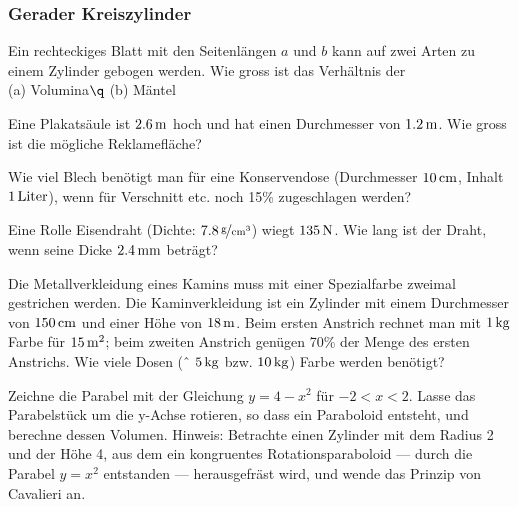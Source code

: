 \documentclass[%
11pt,%
twoside,%
titlepage,%
a4page,%
german,%
headsepline%
]{scrartcl}
\begin{document}
\subsubsection{Gerader Kreiszylinder}
\begin{ueb}
Ein rechteckiges Blatt mit den Seitenl\"angen $a$ und $b$ kann auf zwei Arten zu einem Zylinder gebogen werden. Wie gross ist das Verh\"altnis der \\[1ex]
\hspace*{2.7ex}(a) Volumina$\q$ (b) M\"antel
\end{ueb}

\begin{ueb}
Eine Plakats\"aule ist $\unit[2.6]{m}$ hoch und hat einen Durchmesser von $\unit[1.2]{m}$. Wie gross ist die m\"ogliche Reklamefl\"ache?
\end{ueb}

\begin{ueb}
Wie viel Blech ben\"otigt man f\"ur eine Konservendose (Durchmesser $\unit[10]{cm}$, Inhalt $\unit[1]{Liter}$), wenn f\"ur Verschnitt etc. noch 15\% zugeschlagen werden?
\end{ueb}

\begin{ueb}
Eine Rolle Eisendraht (Dichte: $\unitfrac[7.8]{g}{cm^3}$) wiegt $\unit[135]{N}$. Wie lang ist der Draht, wenn seine Dicke $\unit[2.4]{mm}$ betr\"agt?
\end{ueb}

\begin{ueb}
Die Metallverkleidung eines Kamins muss mit einer Spezialfarbe zweimal gestrichen werden. Die Kaminverkleidung ist ein Zylinder mit einem Durchmesser von $\unit[150]{cm}$ und einer H\"ohe von $\unit[18]{m}$. Beim ersten Anstrich rechnet man mit $\unit[1]{kg}$ Farbe f\"ur $\unit[15]{m^2}$; beim zweiten Anstrich gen\"ugen 70\% der Menge des ersten Anstrichs. Wie viele Dosen (ˆ $\unit[5]{kg}$ bzw. $\unit[10]{kg}$) Farbe werden ben\"otigt?
\end{ueb}

\begin{ueb}
Zeichne die Parabel mit der Gleichung $y=4-x^2$ f\"ur $-2<x<2$. Lasse das Parabelst\"uck um die y-Achse rotieren, so dass ein Paraboloid entsteht, und berechne dessen Volumen. Hinweis: Betrachte einen Zylinder mit dem Radius 2 und der H\"ohe 4, aus dem ein kongruentes Rotationsparaboloid --- durch die Parabel $y=x^2$ entstanden --- herausgefr\"ast wird, und wende das Prinzip von Cavalieri an.
\end{ueb}
\end{document}
